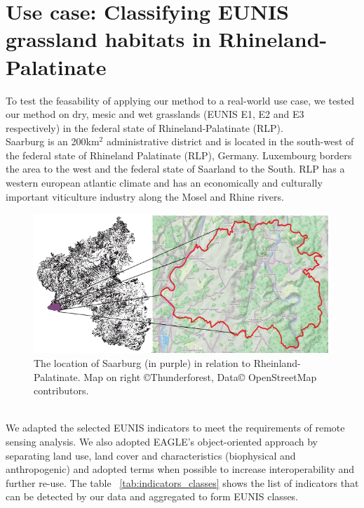 \documentclass[authoryear, review,12pt,number]{elsarticle}
\begin{document}
\section{Use case: Classifying EUNIS grassland habitats in Rhineland-Palatinate}
\label{sec:usecase}
To test the feasability of applying our method to a real-world use case, we 
tested our method on dry, mesic and wet grasslands (EUNIS E1, E2 and E3 
respectively) in the federal state of Rhineland-Palatinate (RLP). 
\\
\label{subsec:data_study_area}
Saarburg is an 200km$^{2}$ administrative district and is located in the
south-west of the federal state of Rhineland Palatinate (RLP), Germany.
Luxembourg borders the area to the west and the federal state of Saarland to
the South. RLP has a western european atlantic climate and has an economically
and culturally important viticulture industry along the Mosel and Rhine rivers.
\begin{figure}
\label{fig_study_area}
    \includegraphics[width=\textwidth]{diagrams/study_area_closeup.png}
    \caption{The location of Saarburg (in purple) in relation to
    Rheinland-Palatinate. Map on right \copyright Thunderforest, Data\copyright
    OpenStreetMap contributors.}
\end{figure}
\\
\label{subsec_target_indicators_nomenclatures}
We adapted the selected EUNIS indicators to meet the requirements of remote
sensing analysis. We also adopted EAGLE's object-oriented approach by separating
land use, land cover and characteristics (biophysical and anthropogenic) and
adopted  terms when possible to increase interoperability and further re-use.
The table ~\ref{tab:indicators_classes} shows the list of indicators that can be
detected by our data and aggregated to form EUNIS classes. 
\end{document}
